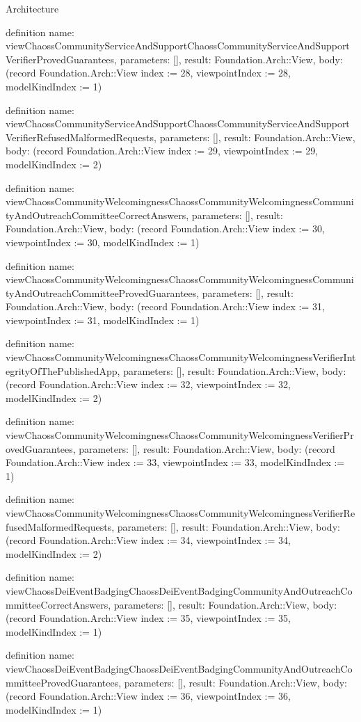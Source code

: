 \begin{lexlean}{Architecture}
\begin{semanticmodule}
definition{
  name: viewChaossCommunityServiceAndSupportChaossCommunityServiceAndSupportVerifierProvedGuarantees,
  parameters: [],
  result: Foundation.Arch::View,
  body: (record Foundation.Arch::View {index := 28, viewpointIndex := 28, modelKindIndex := 1})
}

definition{
  name: viewChaossCommunityServiceAndSupportChaossCommunityServiceAndSupportVerifierRefusedMalformedRequests,
  parameters: [],
  result: Foundation.Arch::View,
  body: (record Foundation.Arch::View {index := 29, viewpointIndex := 29, modelKindIndex := 2})
}

definition{
  name: viewChaossCommunityWelcomingnessChaossCommunityWelcomingnessCommunityAndOutreachCommitteeCorrectAnswers,
  parameters: [],
  result: Foundation.Arch::View,
  body: (record Foundation.Arch::View {index := 30, viewpointIndex := 30, modelKindIndex := 1})
}

definition{
  name: viewChaossCommunityWelcomingnessChaossCommunityWelcomingnessCommunityAndOutreachCommitteeProvedGuarantees,
  parameters: [],
  result: Foundation.Arch::View,
  body: (record Foundation.Arch::View {index := 31, viewpointIndex := 31, modelKindIndex := 1})
}

definition{
  name: viewChaossCommunityWelcomingnessChaossCommunityWelcomingnessVerifierIntegrityOfThePublishedApp,
  parameters: [],
  result: Foundation.Arch::View,
  body: (record Foundation.Arch::View {index := 32, viewpointIndex := 32, modelKindIndex := 2})
}

definition{
  name: viewChaossCommunityWelcomingnessChaossCommunityWelcomingnessVerifierProvedGuarantees,
  parameters: [],
  result: Foundation.Arch::View,
  body: (record Foundation.Arch::View {index := 33, viewpointIndex := 33, modelKindIndex := 1})
}

definition{
  name: viewChaossCommunityWelcomingnessChaossCommunityWelcomingnessVerifierRefusedMalformedRequests,
  parameters: [],
  result: Foundation.Arch::View,
  body: (record Foundation.Arch::View {index := 34, viewpointIndex := 34, modelKindIndex := 2})
}

definition{
  name: viewChaossDeiEventBadgingChaossDeiEventBadgingCommunityAndOutreachCommitteeCorrectAnswers,
  parameters: [],
  result: Foundation.Arch::View,
  body: (record Foundation.Arch::View {index := 35, viewpointIndex := 35, modelKindIndex := 1})
}

definition{
  name: viewChaossDeiEventBadgingChaossDeiEventBadgingCommunityAndOutreachCommitteeProvedGuarantees,
  parameters: [],
  result: Foundation.Arch::View,
  body: (record Foundation.Arch::View {index := 36, viewpointIndex := 36, modelKindIndex := 1})
}


\end{semanticmodule}
\end{lexlean}
